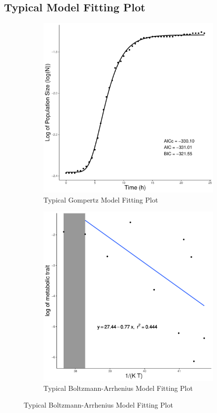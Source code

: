 \subsection{Typical Model Fitting Plot}
\begin{figure}[ht!]
\centering
    \begin{subfigure}{.47\textwidth}
      \centering
      \includegraphics[width=.9\linewidth]{Plot/typ_gomp_fit.pdf}
      \caption{Typical Gompertz Model Fitting Plot}
      \label{fig:typ_gomp_fit}
    \end{subfigure}%
    \begin{subfigure}{.47\textwidth}
      \centering
      \includegraphics[width=.9\linewidth]{Plot/typ_arrhe_fit.pdf}
      \caption{Typical Boltzmann-Arrhenius Model Fitting Plot}
      \label{fig:typ_arrhe_fit}
    \end{subfigure}


\end{figure}
